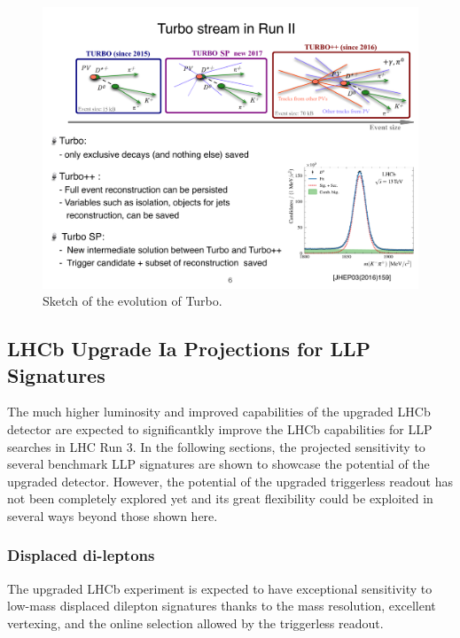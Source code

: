 \begin{figure}[t]
\centerline{\includegraphics[width=1.05\textwidth]{figures/Turbo.pdf}}
  \caption{Sketch of the evolution of Turbo.}
  \label{fig:turbo}
\end{figure}




\subsection{LHCb Upgrade Ia Projections for LLP Signatures}
\label{sec:ulhcbphys}

The much higher luminosity and improved capabilities of the upgraded LHCb detector are expected to significantkly improve the LHCb capabilities for LLP searches in LHC Run 3. In the following sections, the projected sensitivity to several benchmark LLP signatures are shown to showcase the potential of the upgraded detector. However, the potential of the upgraded triggerless readout has not been completely explored yet and its great flexibility could be exploited in several ways beyond those shown here.

\subsubsection{Displaced di-leptons}
The upgraded LHCb experiment is expected to have exceptional sensitivity to low-mass displaced dilepton signatures thanks to the mass resolution, excellent vertexing, and the online selection allowed by the triggerless readout.

